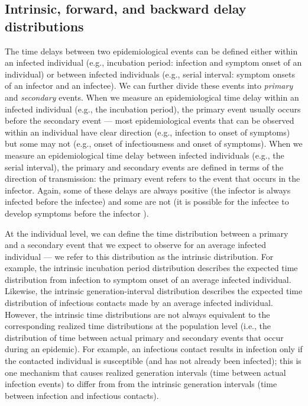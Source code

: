 \documentclass[12pt]{article}
\begin{document}
\subsection{Intrinsic, forward, and backward delay distributions}

The time delays between two epidemiological events can be defined either within an infected individual (e.g., incubation period: infection and symptom onset of an individual) or between infected individuals (e.g., serial interval: symptom onsets of an infector and an infectee).
We can further divide these events into \emph{primary} and \emph{secondary} events.
When we measure an epidemiological time delay within an infected individual (e.g., the incubation period), the primary event usually occurs before the secondary event ---
most epidemiological events that can be observed within an individual have clear direction (e.g., infection to onset of symptoms) but some may not (e.g., onset of infectiousness and onset of symptoms).
When we measure an epidemiological time delay between infected individuals (e.g., the serial interval), 
the primary and secondary events are defined in terms of the direction of transmission:
the primary event refers to the event that occurs in the infector. 
Again, some of these delays are always positive (the infector is always infected before the infectee) and some are not (it is possible for the infectee to develop symptoms before the infector \citep{he2020temporal}).

At the individual level, we can define the time distribution between a primary and a secondary event that we expect to observe for an average infected individual --- we refer to this distribution as the intrinsic distribution.
For example, the intrinsic incubation period distribution describes the expected time distribution from infection to symptom onset of an average infected individual.
Likewise, the intrinsic generation-interval distribution describes the expected time distribution of infectious contacts made by an average infected individual.
However, the intrinsic time distributions are not always equivalent to the corresponding realized time distributions at the population level (i.e., the distribution of time between actual primary and secondary events that occur during an epidemic).
For example, an infectious contact results in infection only if the contacted individual is susceptible (and has not already been infected);
this is one mechanism that causes realized generation intervals (time between actual infection events) to differ from from the intrinsic generation intervals (time between infection and infectious contacts).
\end{document}
